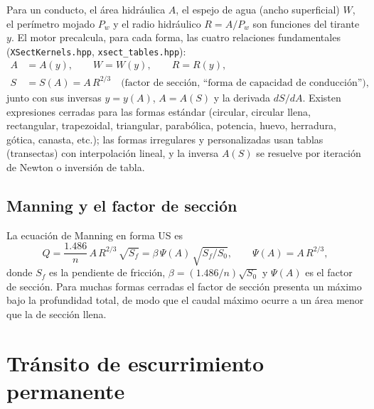 \documentclass[11pt,a4paper]{article}
\begin{document}
Para un conducto, el área hidráulica $A$, el espejo de agua (ancho
superficial) $W$, el perímetro mojado $P_w$ y el radio hidráulico $R = A/P_w$
son funciones del tirante $y$. El motor precalcula, para cada forma, las cuatro
relaciones fundamentales (\texttt{XSectKernels.hpp},
\texttt{xsect\_tables.hpp}):
\begin{align}
  A &= A(y), \qquad W = W(y), \qquad R = R(y), \\
  S &= S(A) = A\,R^{2/3} \quad \text{(factor de sección, ``forma de
  capacidad de conducción''),}
\end{align}
junto con sus inversas $y = y(A)$, $A = A(S)$ y la derivada $dS/dA$. Existen
expresiones cerradas para las formas estándar (circular, circular llena,
rectangular, trapezoidal, triangular, parabólica, potencia, huevo, herradura,
gótica, canasta, etc.); las formas irregulares y personalizadas usan tablas
(transectas) con interpolación lineal, y la inversa $A(S)$ se resuelve por
iteración de Newton o inversión de tabla.

\subsection{Manning y el factor de sección}

La ecuación de Manning en forma US es
\begin{equation}
  Q = \frac{1.486}{n}\,A\,R^{2/3}\,\sqrt{S_f}
  = \beta\,\Psi(A)\,\sqrt{S_f/S_0},
  \qquad \Psi(A) = A\,R^{2/3},
\end{equation}
donde $S_f$ es la pendiente de fricción, $\beta = (1.486/n)\sqrt{S_0}$ y
$\Psi(A)$ es el factor de sección. Para muchas formas cerradas el factor de
sección presenta un máximo bajo la profundidad total, de modo que el caudal
máximo ocurre a un área menor que la de sección llena.

\section{Tránsito de escurrimiento permanente}
\end{document}
